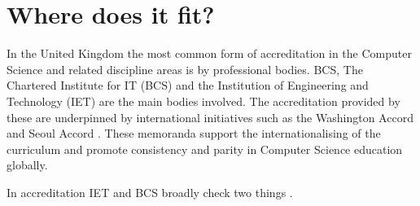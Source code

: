 \documentclass[sigconf]{acmart}
\begin{document}
\begin{comment}

	"Recommendation 9 - Academic Accreditation of Degree Courses.
	
	BCS, IET and Tech Partnership should ensure that existing systems of degree course
	accreditation are flexible, agile, and enable HE providers to respond to changing
	demand and emerging technological trends and developments. Accreditation of courses
	should be focused on outputs. Accrediting bodies should work to increase awareness
	and value of accreditation so that it is valued by HE providers, students and employers,
	and consider how their role can provide a forum for engagement between HE and
	employers.

	Recommendation 10 - Engaging industry in accreditation.

	Employers, through employer groups, such as Tech Partnership, should engage more
	consistently with HE providers and BCS \& IET to ensure accreditation is effective and
	reflects current industry demand."
\end{comment} 


\section {Where does it fit?}

In the United Kingdom the most common form of accreditation in the Computer Science and related discipline areas is by professional bodies.  BCS, The Chartered Institute for IT (BCS) and the Institution of Engineering and Technology (IET) are the main bodies involved. The accreditation provided by these %
are underpinned by international initiatives such as the Washington Accord \cite[for CEng]{Washington2019} and Seoul Accord \cite[for CITP]{Seoul2019}. These memoranda support the internationalising of the curriculum and promote consistency and parity in Computer Science education globally. 

In accreditation IET and BCS broadly check two things \cite{BCS2018a, IET2019}. 
\end{document}
